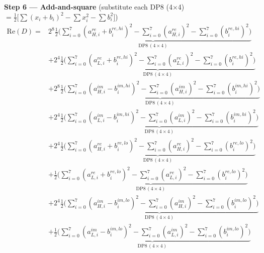 \documentclass[fleqn]{article}
\newcommand{\DPop}[3]{\mathrm{DP#1}\,(#2\!\times\!#3)}
\begin{document}
\textbf{Step 6 --- Add-and-square}\quad
{\small(substitute each DP8 (4$\times$4) $= \tfrac{1}{2}\big[\sum(x_i{+}b_i)^2 - \sum x_i^2 - \sum b_i^2\big]$)}
\begin{align*}
\mathrm{Re}(D) = {}
  & 2^{8}\underbrace{\tfrac{1}{2}\Big(\sum_{i=0}^{7}(a_{H,i}^{re}{+}b_i^{re,hi})^2 - \sum_{i=0}^{7}(a_{H,i}^{re})^2 - \sum_{i=0}^{7}(b_i^{re,hi})^2\Big)}_{\DPop{8}{4}{4}} \\[0.2em]
  & + 2^{4}\underbrace{\tfrac{1}{2}\Big(\sum_{i=0}^{7}(a_{L,i}^{re}{+}b_i^{re,hi})^2 - \sum_{i=0}^{7}(a_{L,i}^{re})^2 - \sum_{i=0}^{7}(b_i^{re,hi})^2\Big)}_{\DPop{8}{4}{4}} \\[0.2em]
  & + 2^{8}\underbrace{\tfrac{1}{2}\Big(\sum_{i=0}^{7}(a_{H,i}^{im}{-}b_i^{im,hi})^2 - \sum_{i=0}^{7}(a_{H,i}^{im})^2 - \sum_{i=0}^{7}(b_i^{im,hi})^2\Big)}_{\DPop{8}{4}{4}} \\[0.2em]
  & + 2^{4}\underbrace{\tfrac{1}{2}\Big(\sum_{i=0}^{7}(a_{L,i}^{im}{-}b_i^{im,hi})^2 - \sum_{i=0}^{7}(a_{L,i}^{im})^2 - \sum_{i=0}^{7}(b_i^{im,hi})^2\Big)}_{\DPop{8}{4}{4}} \\[0.2em]
  & + 2^{4}\underbrace{\tfrac{1}{2}\Big(\sum_{i=0}^{7}(a_{H,i}^{re}{+}b_i^{re,lo})^2 - \sum_{i=0}^{7}(a_{H,i}^{re})^2 - \sum_{i=0}^{7}(b_i^{re,lo})^2\Big)}_{\DPop{8}{4}{4}} \\[0.2em]
  & + \underbrace{\tfrac{1}{2}\Big(\sum_{i=0}^{7}(a_{L,i}^{re}{+}b_i^{re,lo})^2 - \sum_{i=0}^{7}(a_{L,i}^{re})^2 - \sum_{i=0}^{7}(b_i^{re,lo})^2\Big)}_{\DPop{8}{4}{4}} \\[0.2em]
  & + 2^{4}\underbrace{\tfrac{1}{2}\Big(\sum_{i=0}^{7}(a_{H,i}^{im}{-}b_i^{im,lo})^2 - \sum_{i=0}^{7}(a_{H,i}^{im})^2 - \sum_{i=0}^{7}(b_i^{im,lo})^2\Big)}_{\DPop{8}{4}{4}} \\[0.2em]
  & + \underbrace{\tfrac{1}{2}\Big(\sum_{i=0}^{7}(a_{L,i}^{im}{-}b_i^{im,lo})^2 - \sum_{i=0}^{7}(a_{L,i}^{im})^2 - \sum_{i=0}^{7}(b_i^{im,lo})^2\Big)}_{\DPop{8}{4}{4}}
\end{align*}
\end{document}
